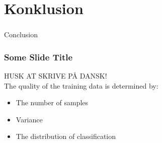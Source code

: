 \section[Konklusion]{Konklusion}

\begin{frame}
  \frametitle{}
  \begin{center}
    {\Huge Conclusion}
  \end{center}
\end{frame}

\begin{frame}
    \frametitle{Some Slide Title}
    HUSK AT SKRIVE PÅ DANSK!\\
    The quality of the training data is determined by:
    \begin{itemize}
        \item The number of samples
        \item Variance
        \item The distribution of classification
    \end{itemize}
\end{frame}
